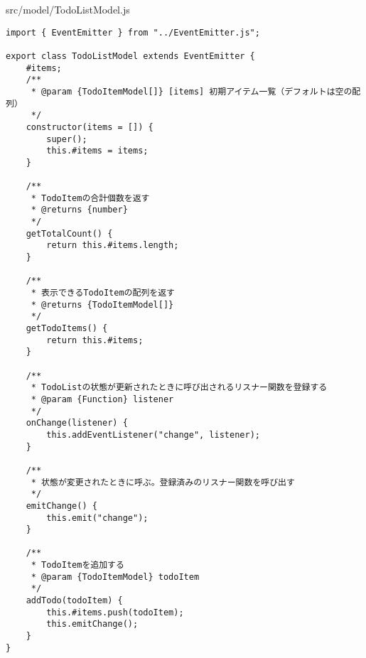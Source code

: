 \begin{listtitle}
src/model/TodoListModel.js
\end{listtitle}
\begin{lstlisting}
import { EventEmitter } from "../EventEmitter.js";

export class TodoListModel extends EventEmitter {
    #items;
    /**
     * @param {TodoItemModel[]} [items] 初期アイテム一覧（デフォルトは空の配列）
     */
    constructor(items = []) {
        super();
        this.#items = items;
    }

    /**
     * TodoItemの合計個数を返す
     * @returns {number}
     */
    getTotalCount() {
        return this.#items.length;
    }

    /**
     * 表示できるTodoItemの配列を返す
     * @returns {TodoItemModel[]}
     */
    getTodoItems() {
        return this.#items;
    }

    /**
     * TodoListの状態が更新されたときに呼び出されるリスナー関数を登録する
     * @param {Function} listener
     */
    onChange(listener) {
        this.addEventListener("change", listener);
    }

    /**
     * 状態が変更されたときに呼ぶ。登録済みのリスナー関数を呼び出す
     */
    emitChange() {
        this.emit("change");
    }

    /**
     * TodoItemを追加する
     * @param {TodoItemModel} todoItem
     */
    addTodo(todoItem) {
        this.#items.push(todoItem);
        this.emitChange();
    }
}
\end{lstlisting}
\listend
